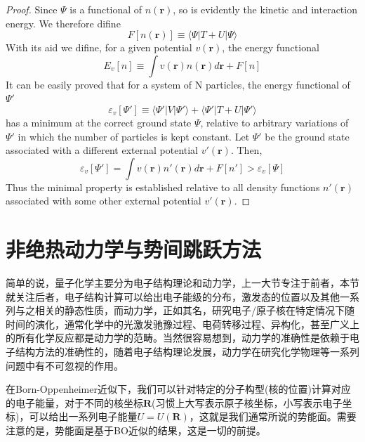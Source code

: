 \documentclass{article}
\newtheorem{proof}{Proof}[section]
\numberwithin{equation}{section}
\newcommand{\bracketl}[3]{\langle #1 | #2 | #3 \rangle}
\begin{document}
  \begin{proof}
  Since $\Psi$ is a functional of $n(\textbf{r})$, so is evidently the kinetic and interaction energy. We therefore difine 
  \begin{equation}
  F[n(\textbf{r})] \equiv \bracketl{\Psi}{T+U}{\Psi}
  \end{equation}
  With its aid we difine, for a given potential $v(\textbf{r})$, the energy functional
  \begin{equation}
  E_v[n]\equiv \int v(\textbf{r})n(\textbf{r})d\textbf{r} + F[n]
  \end{equation}
  It can be easily proved that for a system of N particles, the energy functional of $\Psi'$
  \begin{equation}
  \varepsilon_v[\Psi']\equiv\bracketl{\Psi'}{V}{\Psi'}+\bracketl{\Psi'}{T+U}{\Psi'}
  \end{equation}
  has a minimum at the correct ground state $\Psi$, relative to arbitrary variations of $\Psi'$ in which the number of particles is kept constant. Let $\Psi'$ be the ground state associated with a different external potential $v'(\textbf{r})$. Then,
  \begin{equation}
  \varepsilon_v[\Psi']=\int v(\textbf{r})n'(\textbf{r})d\textbf{r}+F[n']>\varepsilon_v[\Psi]
  \end{equation}
  Thus the minimal property is established relative to all density functions $n'(\textbf{r})$ associated with some other external potential $v'(\textbf{r})$.\cite{PhysRev.136.B864}
  \end{proof}

  \section{非绝热动力学与势间跳跃方法}
    简单的说，量子化学主要分为电子结构理论和动力学，上一大节专注于前者，本节就关注后者，电子结构计算可以给出电子能级的分布，激发态的位置以及其他一系列与之相关的静态性质，而动力学，正如其名，研究电子/原子核在特定情况下随时间的演化，通常化学中的光激发驰豫过程、电荷转移过程、异构化，甚至广义上的所有化学反应都是动力学的范畴。当然很容易想到，动力学的准确性是依赖于电子结构方法的准确性的，随着电子结构理论发展，动力学在研究化学物理等一系列问题中有不可忽视的作用。

    在Born-Oppenheimer近似下，我们可以针对特定的分子构型(核的位置)计算对应的电子能量，对于不同的核坐标$\mathbf{R}$(习惯上大写表示原子核坐标，小写表示电子坐标)，可以给出一系列电子能量$U=U(\mathbf{R})$，这就是我们通常所说的势能面。需要注意的是，势能面是基于BO近似的结果，这是一切的前提。
    
\end{document}
